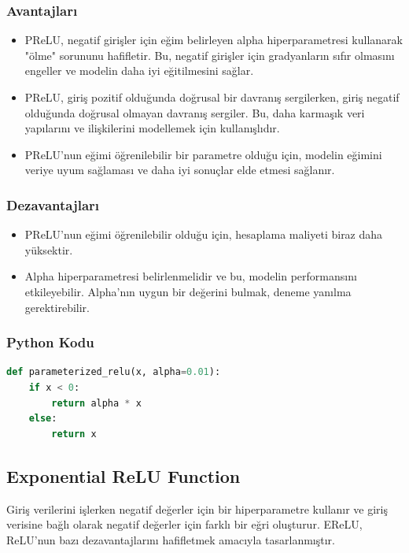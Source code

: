 \subsubsection{Avantajları}
\begin{itemize}
    \item PReLU, negatif girişler için eğim belirleyen alpha hiperparametresi kullanarak "ölme" sorununu hafifletir. Bu, negatif girişler için gradyanların sıfır olmasını engeller ve modelin daha iyi eğitilmesini sağlar.
    \item PReLU, giriş pozitif olduğunda doğrusal bir davranış sergilerken, giriş negatif olduğunda doğrusal olmayan davranış sergiler. Bu, daha karmaşık veri yapılarını ve ilişkilerini modellemek için kullanışlıdır.
    \item PReLU'nun eğimi öğrenilebilir bir parametre olduğu için, modelin eğimini veriye uyum sağlaması ve daha iyi sonuçlar elde etmesi sağlanır.
\end{itemize}

\subsubsection{Dezavantajları}
\begin{itemize}
    \item PReLU'nun eğimi öğrenilebilir olduğu için, hesaplama maliyeti biraz daha yüksektir.
    \item Alpha hiperparametresi belirlenmelidir ve bu, modelin performansını etkileyebilir. Alpha'nın uygun bir değerini bulmak, deneme yanılma gerektirebilir.
\end{itemize}

\subsubsection{Python Kodu}

\begin{lstlisting}[language=Python]
def parameterized_relu(x, alpha=0.01):
    if x < 0:
        return alpha * x
    else:
        return x
\end{lstlisting}

\newpage

\subsection{Exponential ReLU Function}
Giriş verilerini işlerken negatif değerler için bir hiperparametre kullanır ve giriş verisine bağlı olarak negatif değerler için farklı bir eğri oluşturur. EReLU, ReLU'nun bazı dezavantajlarını hafifletmek amacıyla tasarlanmıştır.


